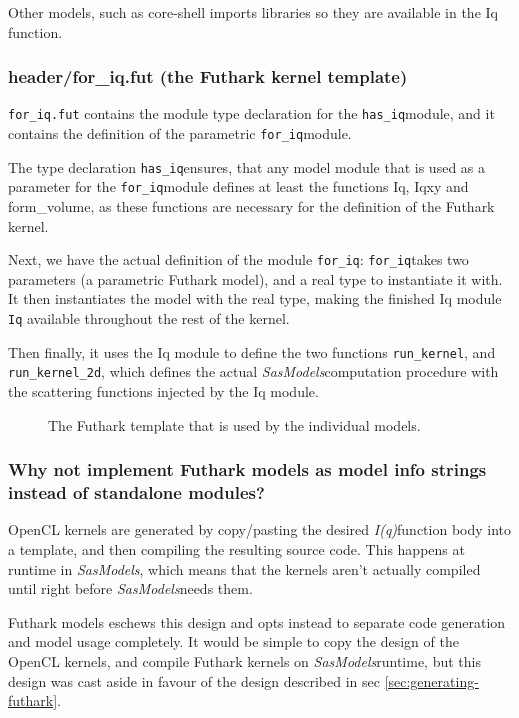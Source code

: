 \documentclass[11pt]{article}
\newcommand{\sasmodels}{\textit{SasModels}}
\newcommand{\iq}{\textit{I(q)}}
\newcommand{\foriq}{\texttt{for\_iq}}
\newcommand{\hasiq}{\texttt{has\_iq}}
\begin{document}
Other models, such as core-shell %
imports libraries so they are available in the Iq function.

\subsubsection{header/for\_iq.fut (the Futhark kernel template)}
\texttt{for\_iq.fut} contains the module type declaration for the \hasiq module,
 and it contains the definition of the parametric \foriq module. 

The type declaration \hasiq ensures, that any model module that is
used as a parameter for the \foriq module defines at least the functions
Iq, Iqxy and form\_volume, as these functions are necessary for the definition
of the Futhark kernel.

Next, we have the actual definition of the module \foriq:
\foriq takes two parameters (a parametric Futhark model), and a real type 
to instantiate it with.
It then instantiates the model with the real type, making the finished Iq module
\texttt{Iq} available throughout the rest of the kernel.

Then finally, it uses the Iq module to define the two functions 
\texttt{run\_kernel}, and \texttt{run\_kernel\_2d}, which defines the actual 
\sasmodels computation procedure with the scattering functions injected by 
the Iq module.

\begin{figure}
  \caption{The Futhark template that is used by the individual models.}
  \label{fig:for-iq}
\end{figure}

\subsubsection{Why not implement Futhark models as model info strings 
instead of standalone modules?}
OpenCL kernels are generated by copy/pasting the desired \iq function body
into a template, and then compiling the resulting source code.
This happens at runtime in \sasmodels, which means that the kernels aren't
 actually compiled until right before \sasmodels needs them.

Futhark models eschews this design and opts instead to separate code generation
and model usage completely.
It would be simple to copy the design of the OpenCL kernels, and compile Futhark
kernels on \sasmodels runtime, but this design was cast aside in favour of the
design described in sec \ref{sec:generating-futhark}.
\end{document}
